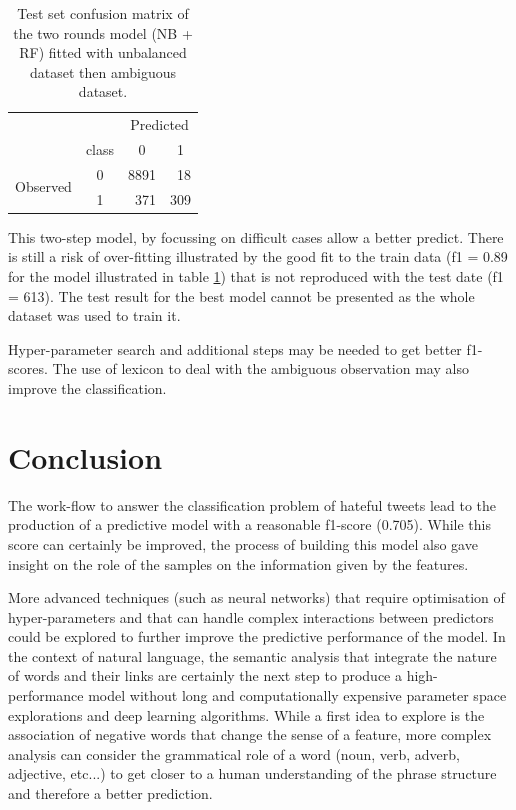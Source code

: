 \documentclass[a4paper, justified]{tufte-handout}
\begin{document}
\begin{fullwidth}
\begin{table}[]\label{final}
\begin{center}
\begin{tabular}{llcr}
                                              &                            & \multicolumn{2}{c}{Predicted}                    \\
                                              & \multicolumn{1}{l|}{class} & 0                        & \multicolumn{1}{c}{1} \\ \cline{2-4} 
\multicolumn{1}{c}{\multirow{2}{*}{Observed}} & \multicolumn{1}{c|}{0}     & \multicolumn{1}{r}{8891} & 18                  \\
\multicolumn{1}{c}{}                          & \multicolumn{1}{c|}{1}     & \multicolumn{1}{r}{371  }   & 309                  
\end{tabular}
\caption{Test set confusion matrix of the two rounds model (NB + RF) fitted with unbalanced dataset then ambiguous dataset.}
\end{center}
\end{table}

This two-step model, by focussing on difficult cases allow a better predict. There is still a risk of over-fitting illustrated by the good fit to the train data (f1 = 0.89 for the model illustrated in table \ref{final}) that is not reproduced with the test date (f1 = 613). The test result for the best model cannot be presented as the whole dataset was used to train it.

Hyper-parameter search and additional steps may be needed to get better f1-scores. The use of lexicon to deal with the ambiguous observation may also improve the classification.


\section{Conclusion}

The work-flow to answer the classification problem of hateful tweets lead to the production of a predictive model with a reasonable f1-score (0.705). While this score can certainly be improved, the process of building this model also gave insight on the role of the samples on the information given by the features.

More advanced techniques (such as neural networks) that require optimisation of hyper-parameters and that can handle complex interactions between predictors could be explored to further improve the predictive performance of the model. In the context of natural language, the semantic analysis that integrate the nature of words and their links are certainly the next step to produce a high-performance model without long and computationally expensive parameter space explorations and deep learning algorithms. While a first idea to explore is the association of negative words that change the sense of a feature, more complex analysis can consider the grammatical role of a word (noun, verb, adverb, adjective, etc...) to get closer to a human understanding of the phrase structure and therefore a better prediction.


\end{fullwidth}
\end{document}
